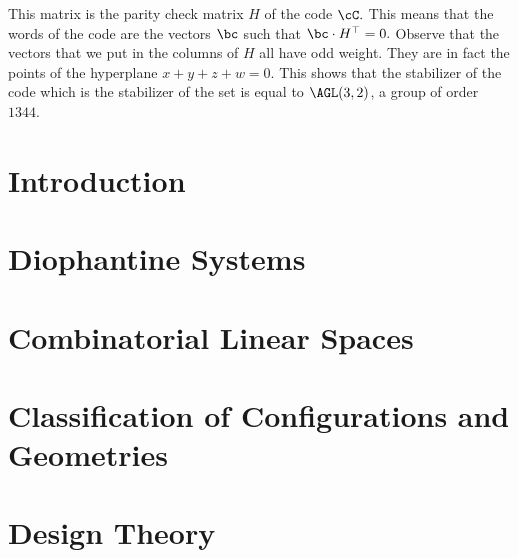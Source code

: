 This matrix is the parity check matrix $H$ of the code $\cC.$
This means that the words of the code are the vectors $\bc$ such that $\bc\cdot H^\top = 0.$
Observe that the vectors that we put in the columns of $H$ all have odd weight. 
They are in fact the points of the hyperplane $x+y+z+w = 0.$ 
This shows that the stabilizer of the code which is the stabilizer of the set is 
equal to $\AGL(3,2)$, a group of order $1344.$

\bigskip
\section{Introduction}
\label{sec:combinatorics:intro}




\bigskip


\clearpage


\section{Diophantine Systems}
\label{sec:diophant}




\bigskip


\clearpage

\section{Combinatorial Linear Spaces}
\label{sec:combinatorial:linear:spaces}




\bigskip


\clearpage


\section{Classification of Configurations and Geometries}
\label{sec:configurations}




\bigskip


\clearpage


\section{Design Theory}
\label{sec:design}










